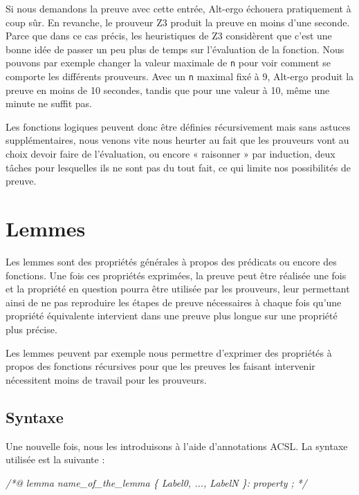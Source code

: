 \documentclass[12pt,francais,]{scrbook}
\newenvironment{Shaded}{}{}
\newcommand{\CommentTok}[1]{\textcolor[rgb]{0.38,0.63,0.69}{\textit{{#1}}}}
\begin{document}
Si nous demandons la preuve avec cette entrée, Alt-ergo échouera
pratiquement à coup sûr. En revanche, le prouveur Z3 produit la preuve
en moins d'une seconde. Parce que dans ce cas précis, les heuristiques
de Z3 considèrent que c'est une bonne idée de passer un peu plus de
temps sur l'évaluation de la fonction. Nous pouvons par exemple changer
la valeur maximale de \texttt{n} pour voir comment se comporte les
différents prouveurs. Avec un \texttt{n} maximal fixé à 9, Alt-ergo
produit la preuve en moins de 10 secondes, tandis que pour une valeur à
10, même une minute ne suffit pas.

Les fonctions logiques peuvent donc être définies récursivement mais
sans astuces supplémentaires, nous venons vite nous heurter au fait que
les prouveurs vont au choix devoir faire de l'évaluation, ou encore «
raisonner » par induction, deux tâches pour lesquelles ils ne sont pas
du tout fait, ce qui limite nos possibilités de preuve.

\section{Lemmes}\label{lemmes}

Les lemmes sont des propriétés générales à propos des prédicats ou
encore des fonctions. Une fois ces propriétés exprimées, la preuve peut
être réalisée une fois et la propriété en question pourra être utilisée
par les prouveurs, leur permettant ainsi de ne pas reproduire les étapes
de preuve nécessaires à chaque fois qu'une propriété équivalente
intervient dans une preuve plus longue sur une propriété plus précise.

Les lemmes peuvent par exemple nous permettre d'exprimer des propriétés
à propos des fonctions récursives pour que les preuves les faisant
intervenir nécessitent moins de travail pour les prouveurs.

\subsection{Syntaxe}\label{syntaxe-2}

Une nouvelle fois, nous les introduisons à l'aide d'annotations ACSL. La
syntaxe utilisée est la suivante :

\begin{footnotesize}\begin{Shaded}
\begin{Highlighting}[]
\CommentTok{/*@}
\CommentTok{  lemma name_of_the_lemma \{ Label0, ..., LabelN \}:}
\CommentTok{    property ;}
\CommentTok{*/}
\end{Highlighting}
\end{Shaded}\end{footnotesize}
\end{document}
